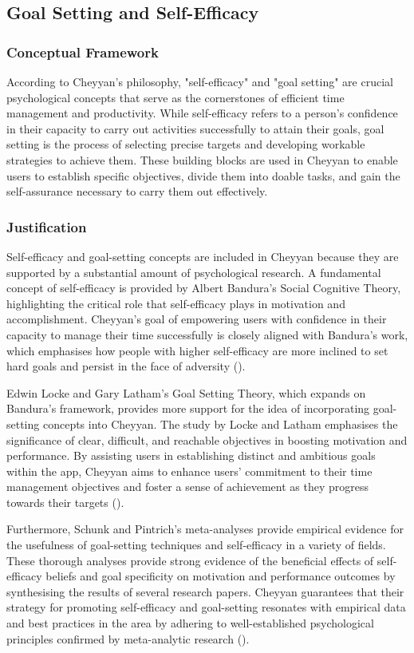 \documentclass{l4proj}
\begin{document}
\subsection{Goal Setting and Self-Efficacy}
\subsubsection{Conceptual Framework}
According to Cheyyan's philosophy, "self-efficacy" and "goal setting" are crucial psychological concepts that serve as the cornerstones of efficient time management and productivity. While self-efficacy refers to a person's confidence in their capacity to carry out activities successfully to attain their goals, goal setting is the process of selecting precise targets and developing workable strategies to achieve them. These building blocks are used in Cheyyan to enable users to establish specific objectives, divide them into doable tasks, and gain the self-assurance necessary to carry them out effectively.

\subsubsection{Justification}
 Self-efficacy and goal-setting concepts are included in Cheyyan because they are supported by a substantial amount of psychological research. A fundamental concept of self-efficacy is provided by Albert Bandura's Social Cognitive Theory, highlighting the critical role that self-efficacy plays in motivation and accomplishment. Cheyyan's goal of empowering users with confidence in their capacity to manage their time successfully is closely aligned with Bandura's work, which emphasises how people with higher self-efficacy are more inclined to set hard goals and persist in the face of adversity (\cite{bandura1986social}).

Edwin Locke and Gary Latham's Goal Setting Theory, which expands on Bandura's framework, provides more support for the idea of incorporating goal-setting concepts into Cheyyan. The study by Locke and Latham emphasises the significance of clear, difficult, and reachable objectives in boosting motivation and performance. By assisting users in establishing distinct and ambitious goals within the app, Cheyyan aims to enhance users' commitment to their time management objectives and foster a sense of achievement as they progress towards their targets (\cite{locke1990theory}).

Furthermore, Schunk and Pintrich's meta-analyses provide empirical evidence for the usefulness of goal-setting techniques and self-efficacy in a variety of fields. These thorough analyses provide strong evidence of the beneficial effects of self-efficacy beliefs and goal specificity on motivation and performance outcomes by synthesising the results of several research papers. Cheyyan guarantees that their strategy for promoting self-efficacy and goal-setting resonates with empirical data and best practices in the area by adhering to well-established psychological principles confirmed by meta-analytic research (\cite{schunk2014motivation}).
\end{document}

